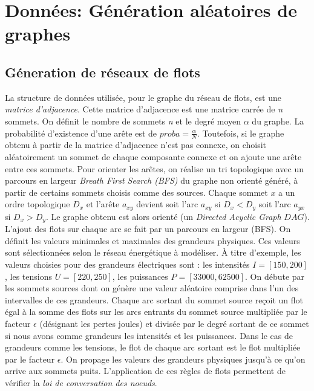 \documentclass[onecolumn, 12pt]{book}
\begin{document}
\section{Donn\'ees: G\'en\'eration al\'eatoires de graphes} 
\subsection{G\'eneration de r\'eseaux de flots}
La structure de donn\'ees utilis\'ee, pour le graphe du r\'eseau de flots, est une {\em matrice d'adjacence}.
Cette matrice d'adjacence est une matrice carr\'ee de {\em n} sommets.
On d\'efinit le nombre de sommets {\em n} et le degr\'e moyen  $\alpha$ du graphe. 
La probabilit\'e d'existence d'une ar\^ete est de $proba = \frac{\alpha}{N}$.
Toutefois, si le graphe obtenu \`a partir de la matrice d'adjacence n'est pas connexe, on choisit al\'eatoirement un sommet de chaque composante connexe et on ajoute une ar\^ete entre ces sommets.
\newline
Pour orienter les ar\^etes, on r\'ealise un tri topologique avec un parcours en largeur {\em Breath First Search (BFS)} du graphe non orient\'e g\'en\'er\'e, \`a partir de certains sommets choisis comme des sources. 
Chaque sommet $x$ a un ordre topologique $D_x$ et l'ar\^ete $a_{xy}$ devient soit l'arc $a_{xy}$ si $D_x < D_y$ soit l'arc $a_{yx}$ si $D_x > D_y$. 
Le graphe obtenu est alors orient\'e (un {\em Directed Acyclic Graph} $DAG$).
\newline
L'ajout des flots sur chaque arc se fait par un parcours en largeur (BFS).
On d\'efinit les valeurs minimales et maximales des grandeurs physiques. 
Ces valeurs sont s\'electionn\'ees selon le r\'eseau \'energ\'etique \`a mod\'eliser. 
\`A titre d'exemple, les valeurs choisies pour des grandeurs \'electriques sont : les intensit\'es $I = [150, 200 ]$, les tensions $U = [220, 250]$, les puissances $P = [ 33000, 62500]$. \newline
On d\'ebute par les sommets sources dont on g\'en\`ere une valeur al\'eatoire comprise dans l'un des intervalles de ces grandeurs. 
Chaque arc sortant du sommet source re\c coit  un flot \'egal \`a la somme des flots sur les arcs entrants du sommet source multipli\'ee par le facteur $\epsilon$ (d\'esignant les pertes joules) et divis\'ee par le degr\'e sortant de ce sommet si nous avons comme grandeurs les intensit\'es et les puissances.
Dans le cas de grandeurs comme les tensions, le flot de chaque arc sortant est le flot multipli\'ee par le facteur $\epsilon$. 
On propage les valeurs des grandeurs physiques jusqu'\`a ce qu'on arrive aux sommets puits.
L'application de ces r\`egles de flots permettent de v\'erifier la {\em loi de conversation des noeuds}.
\end{document}
